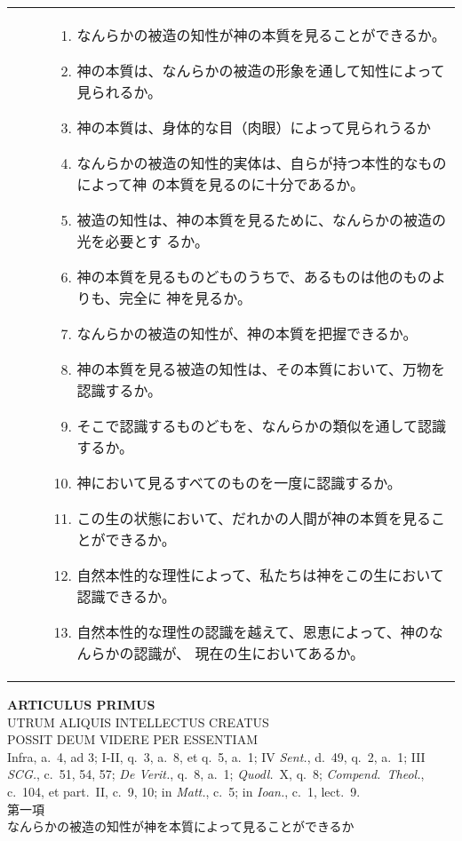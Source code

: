 \documentclass[10pt]{jsarticle} %
\begin{document}
\begin{longtable}{p{21em}p{21em}}
\begin{enumerate}
\end{enumerate}

&

\begin{enumerate}
 \item なんらかの被造の知性が神の本質を見ることができるか。
 \item 神の本質は、なんらかの被造の形象を通して知性によって見られるか。
 \item 神の本質は、身体的な目（肉眼）によって見られうるか
 \item なんらかの被造の知性的実体は、自らが持つ本性的なものによって神
       の本質を見るのに十分であるか。
 \item 被造の知性は、神の本質を見るために、なんらかの被造の光を必要とす
       るか。
 \item 神の本質を見るものどものうちで、あるものは他のものよりも、完全に
       神を見るか。
 \item なんらかの被造の知性が、神の本質を把握できるか。
 \item 神の本質を見る被造の知性は、その本質において、万物を認識するか。
 \item そこで認識するものどもを、なんらかの類似を通して認識するか。
 \item 神において見るすべてのものを一度に認識するか。
 \item この生の状態において、だれかの人間が神の本質を見ることができるか。
 \item 自然本性的な理性によって、私たちは神をこの生において認識できるか。
 \item 自然本性的な理性の認識を越えて、恩恵によって、神のなんらかの認識が、
       現在の生においてあるか。
\end{enumerate}
\end{longtable}

\newpage


\begin{center}
{\Large {\bfseries ARTICULUS PRIMUS}}\\
{\large UTRUM ALIQUIS INTELLECTUS CREATUS\\ POSSIT DEUM VIDERE PER
 ESSENTIAM}\\
{\footnotesize Infra, a.~4, ad 3; I-II, q.~3, a.~8, et q.~5, a.~1; IV
 {\itshape Sent.}, d.~49, q.~2, a.~1; III {\itshape SCG.}, c.~51, 54,
 57; {\itshape De Verit.}, q.~8, a.~1; {\itshape Quodl.}~X, q.~8;
 {\itshape Compend.~Theol.}, c.~104, et part.~II, c.~9, 10; in {\itshape
 Matt.}, c.~5; in {\itshape Ioan.}, c.~1, lect.~9.}\\
{\Large 第一項\\なんらかの被造の知性が神を本質によって見ることができるか}
\end{center}
\end{document}
